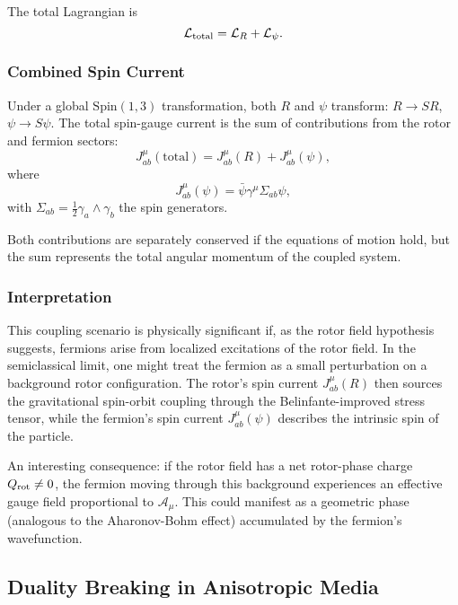 \documentclass[11pt,a4paper]{article}
\numberwithin{equation}{section}
\theoremstyle{plain}
\theoremstyle{definition}
\theoremstyle{remark}
\begin{document}
The total Lagrangian is
\begin{equation}
\mathcal{L}_{\rm total} = \mathcal{L}_R + \mathcal{L}_\psi.
\end{equation}

\subsubsection{Combined Spin Current}

Under a global $\mathrm{Spin}(1,3)$ transformation, both $R$ and $\psi$ transform: $R \to SR$, $\psi \to S\psi$. The total spin-gauge current is the sum of contributions from the rotor and fermion sectors:
\begin{equation}
J^\mu_{ab}(\text{total}) = J^\mu_{ab}(R) + J^\mu_{ab}(\psi),
\end{equation}
where
\begin{equation}
J^\mu_{ab}(\psi) = \bar{\psi}\gamma^\mu\Sigma_{ab}\psi,
\end{equation}
with $\Sigma_{ab} = \frac{1}{2}\gamma_a\wedge\gamma_b$ the spin generators.

Both contributions are separately conserved if the equations of motion hold, but the sum represents the total angular momentum of the coupled system.

\subsubsection{Interpretation}

This coupling scenario is physically significant if, as the rotor field hypothesis suggests, fermions arise from localized excitations of the rotor field. In the semiclassical limit, one might treat the fermion as a small perturbation on a background rotor configuration. The rotor's spin current $J^\mu_{ab}(R)$ then sources the gravitational spin-orbit coupling through the Belinfante-improved stress tensor, while the fermion's spin current $J^\mu_{ab}(\psi)$ describes the intrinsic spin of the particle.

An interesting consequence: if the rotor field has a net rotor-phase charge $Q_{\rm rot} \neq 0$, the fermion moving through this background experiences an effective gauge field proportional to $\mathcal{A}_\mu$. This could manifest as a geometric phase (analogous to the Aharonov-Bohm effect) accumulated by the fermion's wavefunction.

\subsection{Duality Breaking in Anisotropic Media}
\end{document}
